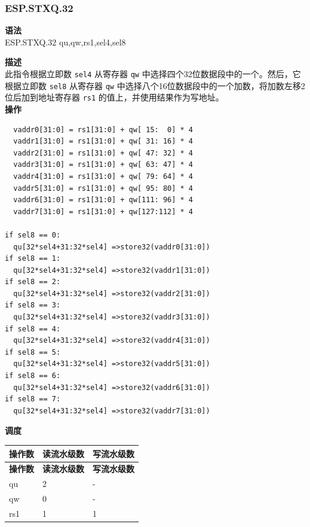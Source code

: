 \newpage

\newpage
\subsubsection{ESP.STXQ.32}\label{instruction:ESPSTXQ32}
\textbf{语法}\\
ESP.STXQ.32 qu,qw,rs1,sel4,sel8

\textbf{描述}\\
此指令根据立即数 \lstinline{sel4} 从寄存器 \lstinline{qw} 中选择四个32位数据段中的一个。然后，它根据立即数 \lstinline{sel8} 从寄存器 \lstinline{qw} 中选择八个16位数据段中的一个加数，将加数左移2位后加到地址寄存器 \lstinline{rs1} 的值上，并使用结果作为写地址。\\
\textbf{操作}
\begin{lstlisting}
  vaddr0[31:0] = rs1[31:0] + qw[ 15:  0] * 4
  vaddr1[31:0] = rs1[31:0] + qw[ 31: 16] * 4
  vaddr2[31:0] = rs1[31:0] + qw[ 47: 32] * 4
  vaddr3[31:0] = rs1[31:0] + qw[ 63: 47] * 4
  vaddr4[31:0] = rs1[31:0] + qw[ 79: 64] * 4
  vaddr5[31:0] = rs1[31:0] + qw[ 95: 80] * 4
  vaddr6[31:0] = rs1[31:0] + qw[111: 96] * 4
  vaddr7[31:0] = rs1[31:0] + qw[127:112] * 4

if sel8 == 0:
  qu[32*sel4+31:32*sel4] =>store32(vaddr0[31:0])
if sel8 == 1:
  qu[32*sel4+31:32*sel4] =>store32(vaddr1[31:0])
if sel8 == 2:
  qu[32*sel4+31:32*sel4] =>store32(vaddr2[31:0])
if sel8 == 3:
  qu[32*sel4+31:32*sel4] =>store32(vaddr3[31:0])
if sel8 == 4:
  qu[32*sel4+31:32*sel4] =>store32(vaddr4[31:0])
if sel8 == 5:
  qu[32*sel4+31:32*sel4] =>store32(vaddr5[31:0])
if sel8 == 6:
  qu[32*sel4+31:32*sel4] =>store32(vaddr6[31:0])
if sel8 == 7:
  qu[32*sel4+31:32*sel4] =>store32(vaddr7[31:0])
\end{lstlisting}

\textbf{调度}\\
\begin{longtable}[c]{|l|l|l|}
    \hline
    \rowcolor{lightgray}
    \textbf{操作数} & \textbf{读流水级数} & \textbf{写流水级数} \\\hline
    \endfirsthead
    \hline
    \rowcolor{lightgray}
     \textbf{操作数} & \textbf{读流水级数} & \textbf{写流水级数} \\\hline
    \endhead
    \hline
    \endfoot

  qu & 2 & - \\\hline
  qw & 0 & - \\\hline
  rs1 & 1 & 1

\end{longtable}

